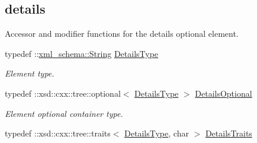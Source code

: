 \subsection*{details}
\label{_amgrp27792947ed5d5da7c0d1f43327ed9dab}
Accessor and modifier functions for the details optional element. \begin{DoxyCompactItemize}
\item 
\hypertarget{classopenstack_1_1xml_1_1CloudServersAPIFault_a557ef1bc026914c9fab01c3390f1843e}{
typedef ::\hyperlink{namespacexml__schema_af6757b5701ccc893f3b551bd70e0c94d}{xml\_\-schema::String} \hyperlink{classopenstack_1_1xml_1_1CloudServersAPIFault_a557ef1bc026914c9fab01c3390f1843e}{DetailsType}}
\label{classopenstack_1_1xml_1_1CloudServersAPIFault_a557ef1bc026914c9fab01c3390f1843e}

\begin{DoxyCompactList}\small\item\em Element type. \item\end{DoxyCompactList}\item 
\hypertarget{classopenstack_1_1xml_1_1CloudServersAPIFault_ab0cea94caf240d5baaa0cfe7a5f52758}{
typedef ::xsd::cxx::tree::optional$<$ \hyperlink{classopenstack_1_1xml_1_1CloudServersAPIFault_a557ef1bc026914c9fab01c3390f1843e}{DetailsType} $>$ \hyperlink{classopenstack_1_1xml_1_1CloudServersAPIFault_ab0cea94caf240d5baaa0cfe7a5f52758}{DetailsOptional}}
\label{classopenstack_1_1xml_1_1CloudServersAPIFault_ab0cea94caf240d5baaa0cfe7a5f52758}

\begin{DoxyCompactList}\small\item\em Element optional container type. \item\end{DoxyCompactList}\item 
\hypertarget{classopenstack_1_1xml_1_1CloudServersAPIFault_a40f6a616bf403db2e99af3534f02d0cb}{
typedef ::xsd::cxx::tree::traits$<$ \hyperlink{classopenstack_1_1xml_1_1CloudServersAPIFault_a557ef1bc026914c9fab01c3390f1843e}{DetailsType}, char $>$ \hyperlink{classopenstack_1_1xml_1_1CloudServersAPIFault_a40f6a616bf403db2e99af3534f02d0cb}{DetailsTraits}}
\label{classopenstack_1_1xml_1_1CloudServersAPIFault_a40f6a616bf403db2e99af3534f02d0cb}


\end{DoxyCompactItemize}
